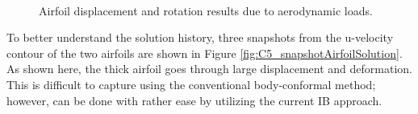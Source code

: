 %
\begin{figure}[H]
    \centering
    \quad
    \\
    \quad
    \caption{Airfoil displacement and rotation results due to aerodynamic loads.}
    \label{fig:C5_airfoilDisplacementRotation}
\end{figure}
%
To better understand the solution history, three snapshots from the u-velocity contour of the two airfoils are shown in Figure \ref{fig:C5_snapshotAirfoilSolution}. As shown here, the thick airfoil goes through large displacement and deformation. This is difficult to capture using the conventional body-conformal method; however, can be done with rather ease by utilizing the current IB approach.
